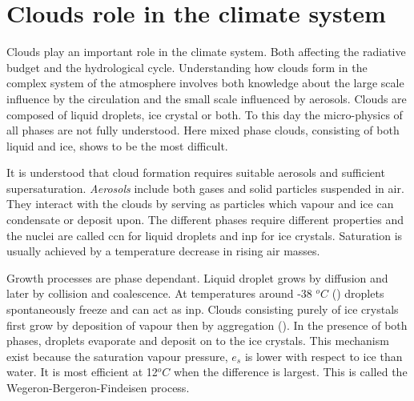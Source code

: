 \section{Clouds role in the climate system} \label{sec:cloud_in_climate_system}
Clouds play an important role in the climate system. Both affecting the radiative budget and the hydrological cycle. Understanding how clouds form in the complex system of the atmosphere involves both knowledge about the large scale influence by the circulation and the small scale influenced by aerosols. Clouds are composed of liquid droplets, ice crystal or both. To this day the micro-physics of all phases are not fully understood. Here mixed phase clouds, consisting of both liquid and ice, shows to be the most difficult. 

It is understood that cloud formation requires suitable aerosols and sufficient supersaturation. \textit{Aerosols} include both gases and solid particles suspended in air. They interact with the clouds by serving as particles which vapour and ice can condensate or deposit upon. The different phases require different properties and the nuclei are called \acrfull{ccn} for liquid droplets and \acrfull{inp} for ice crystals. Saturation is usually achieved by a temperature decrease in rising air masses. %
 
Growth processes are phase dependant. Liquid droplet grows by diffusion and later by collision and coalescence. At temperatures around -38 $^oC$ (\cite{lohmann2016}) droplets spontaneously freeze and can act as \acrshort{inp}. Clouds consisting purely of ice crystals first grow by deposition of vapour then by aggregation (\cite{Fowler1996LiquidAssumptions}). In the presence of both phases, droplets evaporate and deposit on to the ice crystals.
This mechanism exist because the saturation vapour pressure, $e_s$ is lower with respect to ice than water. It is most efficient at 12$^oC$ when the difference is largest. This is called the Wegeron-Bergeron-Findeisen process.

